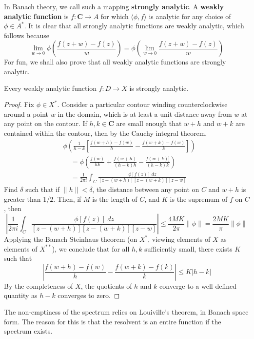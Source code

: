 In Banach theory, we call such a mapping {\bf strongly analytic}. A {\bf weakly analytic function} is $f: \mathbf{C} \to A$ for which $\langle \phi, f \rangle$ is analytic for any choice of $\phi \in A^*$. It is clear that all strongly analytic functions are weakly analytic, which follows because
%
\[ \lim_{w \to 0} \phi \left( \frac{f(z + w) - f(z)}{w} \right) = \phi \left( \lim_{w \to 0} \frac{f(z + w) - f(z)}{w} \right) \]
%
For fun, we shall also prove that all weakly analytic functions are strongly analytic.

\begin{theorem}
    Every weakly analytic function $f: D \to X$ is strongly analytic.
\end{theorem}
\begin{proof}
    Fix $\phi \in X^*$. Consider a particular contour winding counterclockwise around a point $w$ in the domain, which is at least a unit distance away from $w$ at any point on the contour. If $h,k \in \mathbf{C}$ are small enough that $w + h$ and $w + k$ are contained within the contour, then by the Cauchy integral theorem,
    \begin{align*}
        &\phi\left( \frac{1}{h-k} \left[ \frac{f(w + h) - f(w)}{h} - \frac{f(w + k) - f(w)}{k} \right] \right)\\
        &\ \ \ \ \ =  \phi \left( \frac{f(w)}{hk} + \frac{f(w + h)}{(h - k)h} - \frac{f(w + k)]}{(h - k)k} \right)\\
        &\ \ \ \ \ = \frac{1}{2\pi i} \int_C \frac{\phi[f(z)]\ dz}{[z - (w + h)][z - (w + k)][z - w]}
    \end{align*}
    Find $\delta$ such that if $\| h \| < \delta$, the distance between any point on $C$ and $w + h$ is greater than $1/2$. Then, if $M$ is the length of $C$, and $K$ is the supremum of $f$ on $C$, then
    \[ \left| \frac{1}{2\pi i} \int_C \frac{\phi[f(z)]\ dz}{[z - (w + h)][z - (w + k)][z - w]}\right| \leq \frac{4MK}{2 \pi} \| \phi \| = \frac{2MK}{\pi} \| \phi \| \]
    Applying the Banach Steinhaus theorem (on $X^*$, viewing elements of $X$ as elements of $X^{**}$), we conclude that for all $h,k$ sufficiently small, there exists $K$ such that
    \[ \left| \frac{f(w + h) - f(w)}{h} - \frac{f(w + k) - f(k)}{k} \right| \leq K |h - k| \]
    By the completeness of $X$, the quotients of $h$ and $k$ converge to a well defined quantity as $h - k$ converges to zero.
\end{proof}

The non-emptiness of the spectrum relies on Louiville's theorem, in Banach space form. The reason for this is that the resolvent is an entire function if the spectrum exists.

